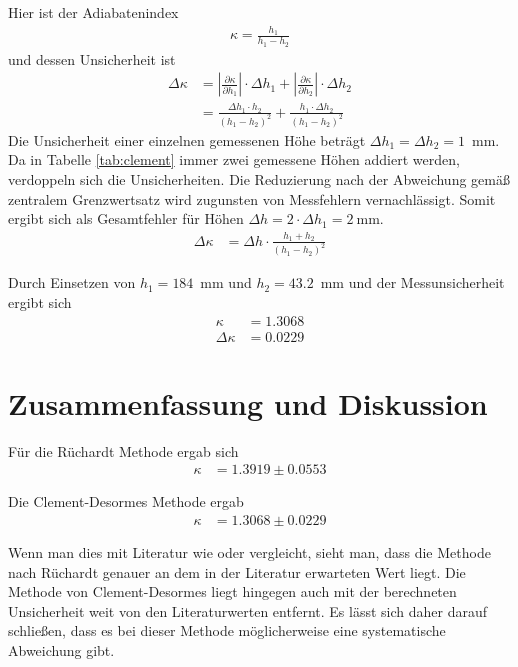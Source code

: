 \documentclass{article}
\begin{document}
Hier ist der Adiabatenindex
\begin{align}
\kappa = \frac{h_1}{h_1-h_2}
\end{align}
und dessen Unsicherheit ist
\begin{align}
\Delta \kappa &= \left| \frac{\partial\kappa}{\partial h_1}\right|\cdot \Delta h_1 + \left| \frac{\partial\kappa}{\partial h_2}\right|\cdot \Delta h_2 \\
&= \frac{\Delta h_1 \cdot h_2}{(h_1-h_2)^2} + \frac{h_1\cdot \Delta h_2}{(h_1-h_2)^2}
\end{align}
Die Unsicherheit einer einzelnen gemessenen Höhe beträgt $\Delta h_1 = \Delta h_2 = 1$~mm. Da in Tabelle \ref{tab:clement} immer zwei gemessene Höhen addiert werden, verdoppeln sich die Unsicherheiten. Die Reduzierung nach der Abweichung gemäß zentralem Grenzwertsatz wird zugunsten von Messfehlern vernachlässigt. Somit ergibt sich als Gesamtfehler für Höhen $\Delta h = 2\cdot \Delta h_1 = 2~$mm.
\begin{align}
\Delta \kappa &= \Delta h \cdot\frac{h_1 + h_2}{(h_1-h_2)^2}
\end{align}

Durch Einsetzen von $h_1=184$~mm und $h_2 = 43.2$~mm und der Messunsicherheit ergibt sich
\begin{align}
\kappa &= 1.3068 \\
\Delta \kappa &= 0.0229
\end{align}


\newpage
\section{Zusammenfassung und Diskussion}

Für die Rüchardt Methode ergab sich
\begin{align}
\kappa &= 1.3919 \pm 0.0553
\end{align}

Die Clement-Desormes Methode ergab
\begin{align}
\kappa &= 1.3068 \pm 0.0229
\end{align}

Wenn man dies mit Literatur wie \cite{demtr1} oder \cite{giancoli} vergleicht, sieht man, dass die Methode nach Rüchardt genauer an dem in der Literatur erwarteten Wert liegt. Die Methode von Clement-Desormes liegt hingegen auch mit der berechneten Unsicherheit weit von den Literaturwerten entfernt. Es lässt sich daher darauf schließen, dass es bei dieser Methode möglicherweise eine systematische Abweichung gibt.
\end{document}
